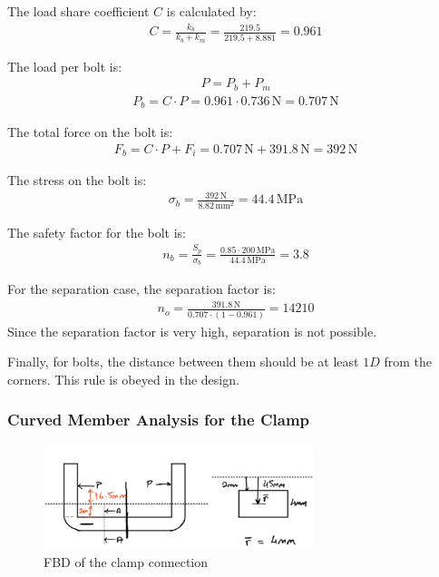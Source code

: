 \documentclass[12pt]{report}
\begin{document}
The load share coefficient \( C \) is calculated by:
\begin{align}
C = \frac{k_b}{k_b + k_m} = \frac{219.5}{219.5 + 8.881} = 0.961
\end{align}

The load per bolt is:
\begin{align}
P = P_b + P_m
\end{align}
\begin{align}
P_b = C \cdot P = 0.961 \cdot 0.736 \, \text{N} = 0.707 \, \text{N}
\end{align}

The total force on the bolt is:
\begin{align}
F_b = C \cdot P + F_i = 0.707 \, \text{N} + 391.8 \, \text{N} = 392 \, \text{N}
\end{align}

The stress on the bolt is:
\begin{align}
\sigma_b = \frac{392 \, \text{N}}{8.82 \, \text{mm}^2} = 44.4 \, \text{MPa}
\end{align}

The safety factor for the bolt is:
\begin{align}
n_b = \frac{S_p}{\sigma_b} = \frac{0.85 \cdot 200 \, \text{MPa}}{44.4 \, \text{MPa}} = 3.8
\end{align}

For the separation case, the separation factor is:
\begin{align}
n_o = \frac{391.8 \, \text{N}}{0.707 \cdot (1 - 0.961)} = 14210
\end{align}
Since the separation factor is very high, separation is not possible.

Finally, for bolts, the distance between them should be at least \( 1D \) from the corners. This rule is obeyed in the design.

\subsubsection{Curved Member Analysis for the Clamp }
\begin{figure}[h]
    \centering
    \includegraphics[width=0.7\textwidth]{Figures/Figures/curvedmember.png}
    \caption{FBD of the clamp connection}
    \label{fig:curvedmember}
\end{figure}
\end{document}
